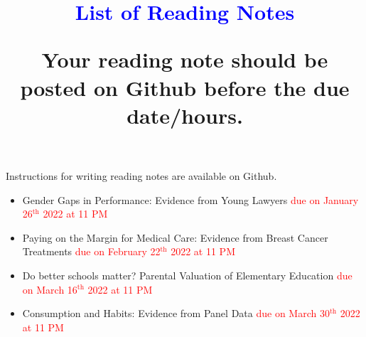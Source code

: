 \documentclass[10pt,letterpaper]{article}
\newcommand{\1}{\mathds{1}}
\begin{document}
\doublespacing

\title{\textcolor{blue}{List of Reading Notes}\\
\begin{minipage}[t]{.85\textwidth}
\large Your reading note should be posted on Github before the due date/hours. 
\end{minipage}
}
\date{}
\maketitle

\begin{minipage}[t]{.85\textwidth}
Instructions for writing reading notes are available on Github.
\begin{itemize}
 \item Gender Gaps in Performance: Evidence from Young Lawyers \textcolor{red}{ due on January 26$^{\text{th}}$ 2022 at 11 PM}
 \item Paying on the Margin for Medical Care:
 Evidence from Breast Cancer Treatments \textcolor{red}{due on February 22$^{\text{th}}$ 2022 at 11 PM}
 \item Do better schools matter? Parental Valuation of Elementary Education \textcolor{red}{ due on March 16$^{\text{th}}$ 2022 at 11 PM}
 \item Consumption and Habits: Evidence from Panel Data \textcolor{red}{ due on March 30$^{\text{th}}$ 2022 at 11 PM}
\end{itemize}
\end{minipage}
\end{document}

